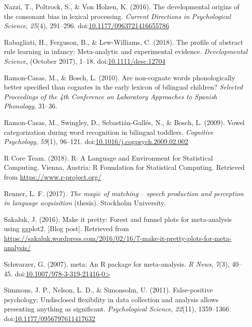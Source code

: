 \documentclass[man]{apa6}
\begin{document}
\leavevmode\hypertarget{ref-Nazzi2016}{}%
Nazzi, T., Poltrock, S., \& Von Holzen, K. (2016). The developmental origins of the consonant bias in lexical processing. \emph{Current Directions in Psychological Science}, \emph{25}(4), 291--296. doi:\href{https://doi.org/10.1177/0963721416655786}{10.1177/0963721416655786}

\leavevmode\hypertarget{ref-Rabagliati2018}{}%
Rabagliati, H., Ferguson, B., \& Lew-Williams, C. (2018). The profile of abstract rule learning in infancy: Meta-analytic and experimental evidence. \emph{Developmental Science}, (October 2017), 1--18. doi:\href{https://doi.org/10.1111/desc.12704}{10.1111/desc.12704}

\leavevmode\hypertarget{ref-Ramon-Casas2010}{}%
Ramon-Casas, M., \& Bosch, L. (2010). Are non-cognate words phonologically better specified than cognates in the early lexicon of bilingual children? \emph{Selected Proceedings of the 4th Conference on Laboratory Approaches to Spanish Phonology}, 31--36.

\leavevmode\hypertarget{ref-Ramon-Casas2009}{}%
Ramon-Casas, M., Swingley, D., Sebastián-Gallés, N., \& Bosch, L. (2009). Vowel categorization during word recognition in bilingual toddlers. \emph{Cognitive Psychology}, \emph{59}(1), 96--121. doi:\href{https://doi.org/10.1016/j.cogpsych.2009.02.002}{10.1016/j.cogpsych.2009.02.002}

\leavevmode\hypertarget{ref-R}{}%
R Core Team. (2018). R: A Language and Environment for Statistical Computing. Vienna, Austria: R Foundation for Statistical Computing. Retrieved from \url{https://www.r-project.org/}

\leavevmode\hypertarget{ref-Renner2017}{}%
Renner, L. F. (2017). \emph{The magic of matching -- speech production and perception in language acquisition} (thesis). Stockholm University.

\leavevmode\hypertarget{ref-Sakaluk2016}{}%
Sakaluk, J. (2016). Make it pretty: Forest and funnel plots for meta-analysis using ggplot2. {[}Blog post{]}. Retrieved from \url{https://sakaluk.wordpress.com/2016/02/16/7-make-it-pretty-plots-for-meta-analysis/}

\leavevmode\hypertarget{ref-meta}{}%
Schwarzer, G. (2007). meta: An R package for meta-analysis. \emph{R News}, \emph{7}(3), 40--45. doi:\href{https://doi.org/10.1007/978-3-319-21416-0\%3E}{10.1007/978-3-319-21416-0\textgreater{}}

\leavevmode\hypertarget{ref-Simmons2011}{}%
Simmons, J. P., Nelson, L. D., \& Simonsohn, U. (2011). False-positive psychology: Undisclosed flexibility in data collection and analysis allows presenting anything as significant. \emph{Psychological Science}, \emph{22}(11), 1359--1366. doi:\href{https://doi.org/10.1177/0956797611417632}{10.1177/0956797611417632}
\end{document}
